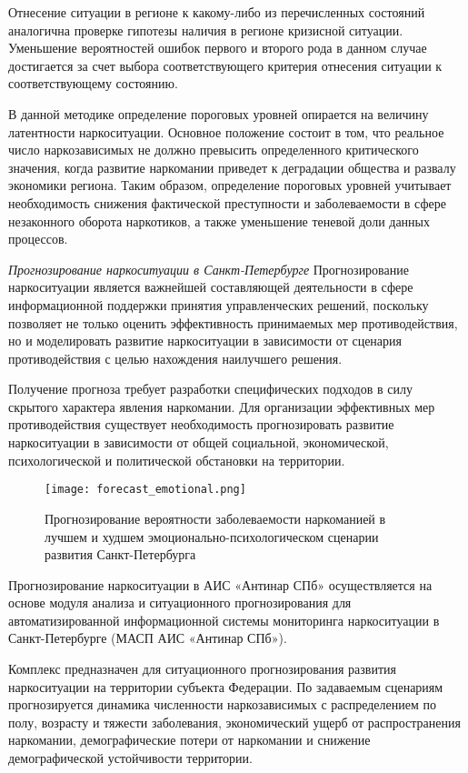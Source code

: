 Отнесение ситуации в регионе к какому-либо из перечисленных состояний аналогична
проверке гипотезы наличия в регионе кризисной ситуации. Уменьшение вероятностей
ошибок первого и второго рода в данном случае достигается за счет выбора
соответствующего критерия отнесения ситуации к соответствующему состоянию. 

В данной методике определение пороговых уровней опирается на величину
латентности наркоситуации. Основное положение состоит в том, что реальное число
наркозависимых не должно превысить определенного критического значения, когда
развитие наркомании приведет к деградации общества и развалу экономики региона.
Таким образом, определение пороговых уровней учитывает необходимость снижения
фактической преступности и заболеваемости в сфере незаконного оборота
наркотиков, а также уменьшение теневой доли данных процессов.

\textit{Прогнозирование наркоситуации в Санкт-Петербурге}
Прогнозирование наркоситуации является важнейшей составляющей деятельности в
сфере информационной поддержки принятия управленческих решений, поскольку
позволяет не только оценить эффективность принимаемых мер противодействия, но и
моделировать развитие наркоситуации в зависимости от сценария противодействия с
целью нахождения наилучшего решения.

Получение прогноза требует разработки специфических подходов в силу скрытого
характера явления наркомании. Для организации эффективных мер противодействия
существует необходимость прогнозировать развитие наркоситуации в зависимости от
общей социальной, экономической, психологической и политической  обстановки на
территории.

\begin{figure}
    \texttt{[image: forecast\_emotional.png]}
    \caption{Прогнозирование вероятности заболеваемости наркоманией в лучшем и
    худшем эмоционально-психологическом сценарии развития Санкт-Петербурга}
    \label{fig:forecast_emotional}
\end{figure}

Прогнозирование наркоситуации в АИС «Антинар СПб» осуществляется на основе
модуля анализа и ситуационного прогнозирования для автоматизированной
информационной системы мониторинга наркоситуации в Санкт-Петербурге (МАСП АИС
«Антинар СПб»). 

Комплекс предназначен для ситуационного прогнозирования развития наркоситуации
на территории субъекта Федерации. По задаваемым сценариям прогнозируется
динамика численности наркозависимых с распределением по полу, возрасту и тяжести
заболевания, экономический ущерб от распространения наркомании, демографические
потери от наркомании и снижение демографической устойчивости территории.

